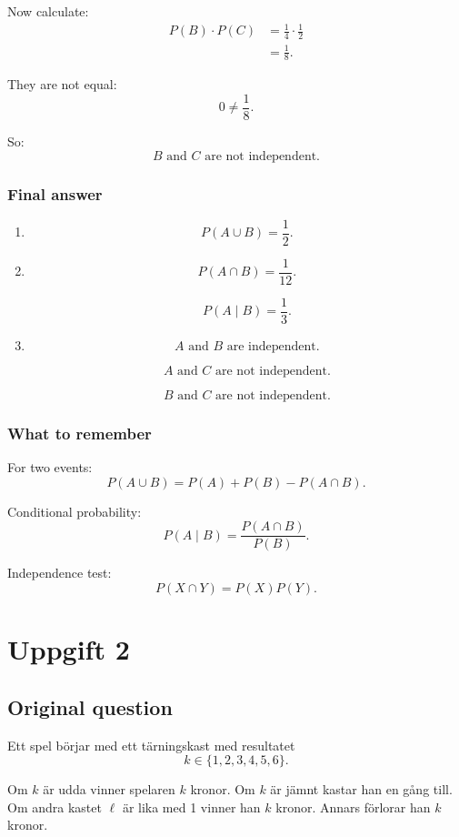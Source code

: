 \documentclass[10pt]{article}
\begin{document}
Now calculate:
\begin{align*}
P(B)\cdot P(C)
&=
\frac{1}{4}\cdot\frac{1}{2}
\\[2mm]
&=
\frac{1}{8}.
\end{align*}

They are not equal:
\[
0\ne \frac{1}{8}.
\]

So:
\[
B \text{ and } C
\text{ are not independent.}
\]

\subsubsection*{Final answer}

\begin{enumerate}[label=\alph*)]
\item
\[
P(A\cup B)=\frac{1}{2}.
\]

\item
\[
P(A\cap B)=\frac{1}{12}.
\]

\[
P(A\mid B)=\frac{1}{3}.
\]

\item
\[
A \text{ and } B
\text{ are independent.}
\]

\[
A \text{ and } C
\text{ are not independent.}
\]

\[
B \text{ and } C
\text{ are not independent.}
\]
\end{enumerate}

\subsubsection*{What to remember}

For two events:
\[
P(A\cup B)
=
P(A)+P(B)-P(A\cap B).
\]

Conditional probability:
\[
P(A\mid B)
=
\frac{P(A\cap B)}{P(B)}.
\]

Independence test:
\[
P(X\cap Y)
=
P(X)P(Y).
\]

\section*{Uppgift 2}

\subsection*{Original question}

Ett spel börjar med ett tärningskast med resultatet
\[
k\in \{1,2,3,4,5,6\}.
\]

Om \(k\) är udda vinner spelaren \(k\) kronor.
Om \(k\) är jämnt kastar han en gång till.
Om andra kastet \(\ell\) är lika med 1 vinner han
\(k\) kronor. Annars förlorar han \(k\) kronor.
\end{document}
